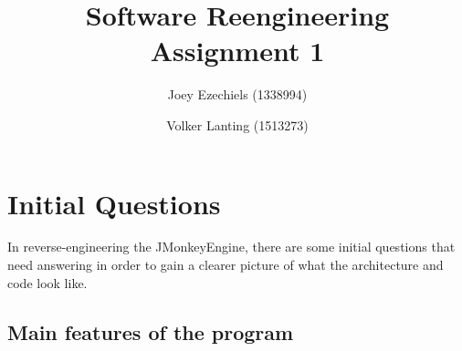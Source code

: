 \documentclass[a4paper, 10pt]{article}
\title{Software Reengineering\\
       Assignment 1}
\author{Joey Ezechiels (1338994) \and Volker Lanting (1513273)}
\begin{document}
\maketitle %

\newpage
\tableofcontents %


\newpage
{}
\section{Initial Questions}
\label{sec:initial_question}
In reverse-engineering the JMonkeyEngine, there are some initial
questions that need answering in order to gain a clearer picture
of what the architecture and code look like.



\subsection{Main features of the program}
\label{sec:main_features}
\end{document}
